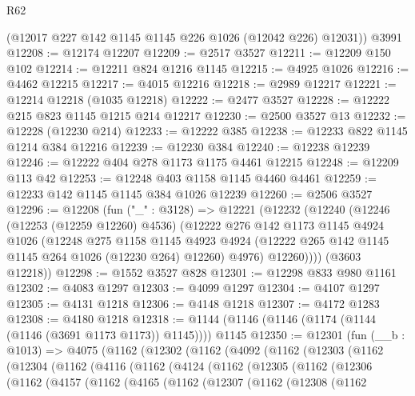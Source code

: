 \begin{lexlean}{R62}
\begin{coremodule}
      (@12017 @227 @142 @1145 @1145 @226 @1026 (@12042 @226) @12031))
    @3991
@12208 := @12174 @12207
@12209 := @2517 @3527
@12211 := @12209 @150 @102
@12214 := @12211 @824 @1216 @1145
@12215 := @4925 @1026
@12216 := @4462 @12215
@12217 := @4015 @12216
@12218 := @2989 @12217
@12221 := @12214 @12218 (@1035 @12218)
@12222 := @2477 @3527
@12228 := @12222 @215 @823 @1145 @1215 @214 @12217
@12230 := @2500 @3527 @13
@12232 := @12228 (@12230 @214)
@12233 := @12222 @385
@12238 := @12233 @822 @1145 @1214 @384 @12216
@12239 := @12230 @384
@12240 := @12238 @12239
@12246 := @12222 @404 @278 @1173 @1175 @4461 @12215
@12248 := @12209 @113 @42
@12253 := @12248 @403 @1158 @1145 @4460 @4461
@12259 := @12233 @142 @1145 @1145 @384 @1026 @12239
@12260 := @2506 @3527
@12296 := @12208
    (fun ("_" : @3128) =>
    @12221
      (@12232
        (@12240
          (@12246
            (@12253 (@12259 @12260) @4536)
            (@12222
              @276
              @142
              @1173
              @1145
              @4924
              @1026
              (@12248
                @275
                @1158
                @1145
                @4923
                @4924
                (@12222 @265 @142 @1145 @1145 @264 @1026 (@12230 @264) @12260)
                @4976)
              @12260))))
      (@3603 @12218))
@12298 := @1552 @3527 @828
@12301 := @12298 @833 @980 @1161
@12302 := @4083 @1297
@12303 := @4099 @1297
@12304 := @4107 @1297
@12305 := @4131 @1218
@12306 := @4148 @1218
@12307 := @4172 @1283
@12308 := @4180 @1218
@12318 := @1144 (@1146 (@1146 (@1174 (@1144 (@1146 (@3691 @1173 @1173)) @1145)))) @1145
@12350 := @12301
    (fun (__b : @1013) =>
    @4075
      (@1162
        (@12302
          (@1162
            (@4092
              (@1162
                (@12303
                  (@1162
                    (@12304
                      (@1162
                        (@4116
                          (@1162
                            (@4124
                              (@1162
                                (@12305
                                  (@1162
                                    (@12306
                                      (@1162
                                        (@4157
                                          (@1162
                                            (@4165
                                              (@1162
                                                (@12307
                                                  (@1162
                                                    (@12308
                                                      (@1162

\end{coremodule}
\end{lexlean}
